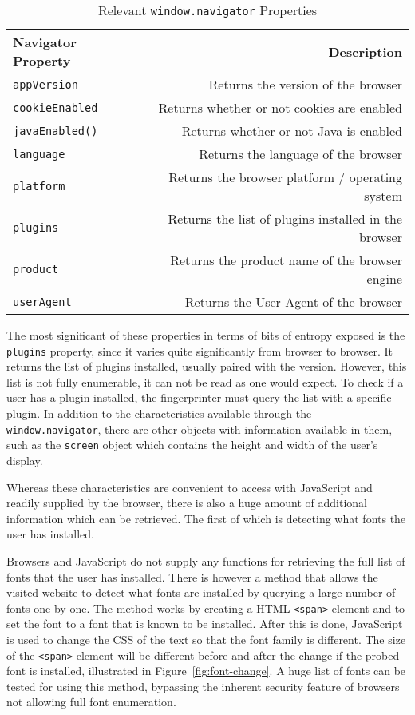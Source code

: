 \begin{table}[h]
\centering
\begin{tabular}{| l | r |}
    \hline
    \textbf{Navigator Property} & \textbf{Description} \\ \hline
    \texttt{appVersion} & {Returns the version of the browser} \\ \hline
    \texttt{cookieEnabled} & {Returns whether or not cookies are enabled} \\ \hline
    \texttt{javaEnabled()} & {Returns whether or not Java is enabled} \\ \hline
    \texttt{language} & {Returns the language of the browser} \\ \hline
    \texttt{platform} & {Returns the browser platform / operating system} \\ \hline
    \texttt{plugins} & {Returns the list of plugins installed in the browser} \\ \hline
    \texttt{product} & {Returns the product name of the browser engine} \\ \hline
    \texttt{userAgent} & {Returns the User Agent of the browser} \\
    \hline
\end{tabular}
\caption{Relevant \texttt{window.navigator} Properties}
\label{tab:navigator-props}
\end{table}

The most significant of these properties in terms of bits of entropy exposed is the \texttt{plugins} property, since it varies quite significantly from browser to browser.
It returns the list of plugins installed, usually paired with the version.
However, this list is not fully enumerable, it can not be read as one would expect.
To check if a user has a plugin installed, the fingerprinter must query the list with a specific plugin.
In addition to the characteristics available through the \texttt{window.navigator}, there are other objects with information available in them, such as the \texttt{screen} object which contains the height and width of the user's display.

Whereas these characteristics are convenient to access with JavaScript and readily supplied by the browser, there is also a huge amount of additional information which can be retrieved.
The first of which is detecting what fonts the user has installed.

Browsers and JavaScript do not supply any functions for retrieving the full list of fonts that the user has installed.
There is however a method that allows the visited website to detect what fonts are installed by querying a large number of fonts one-by-one.
The method works by creating a HTML \texttt{<span>} element and to set the font to a font that is known to be installed.
After this is done, JavaScript is used to change the CSS of the text so that the font family is different.
The size of the \texttt{<span>} element will be different before and after the change if the probed font is installed, illustrated in Figure~\ref{fig:font-change}.
A huge list of fonts can be tested for using this method, bypassing the inherent security feature of browsers not allowing full font enumeration.

